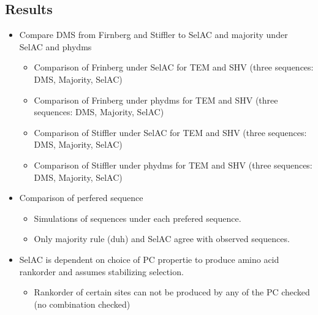 \documentclass[12pt]{article}
\begin{document}
\subsection*{Results}
\begin{itemize}
	\item Compare DMS from Firnberg and Stiffler to SelAC and majority under SelAC and phydms
	\begin{itemize}
		\item Comparison of Frinberg under SelAC for TEM and SHV (three sequences: DMS, Majority, SelAC)
		\item Comparison of Frinberg under phydms for TEM and SHV (three sequences: DMS, Majority, SelAC)
		\item Comparison of Stiffler under SelAC for TEM and SHV (three sequences: DMS, Majority, SelAC)
		\item Comparison of Stiffler under phydms for TEM and SHV (three sequences: DMS, Majority, SelAC)
	\end{itemize}
	\item Comparison of perfered sequence
	\begin{itemize}
		\item Simulations of sequences under each prefered sequence.
		\item Only majority rule (duh) and SelAC agree with observed sequences. 
	\end{itemize} 
	\item SelAC is dependent on choice of PC propertie to produce amino acid rankorder and assumes stabilizing selection. 
	\begin{itemize}
		\item Rankorder of certain sites can not be produced by any of the PC checked (no combination checked)
	\end{itemize}
\end{itemize}
\end{document}
